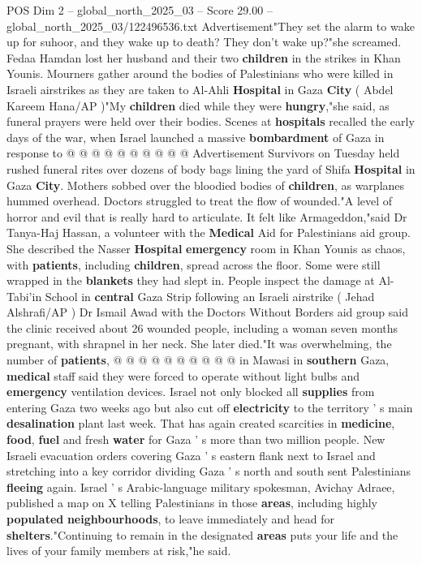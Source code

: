 \begin{textsample}{POS Dim 2 – global\_north\_2025\_03 – Score 29.00 – global\_north\_2025\_03/122496536.txt}
Advertisement"They set the alarm to wake up for suhoor, and they wake up to death?
They don't wake up?"she screamed.
Fedaa Hamdan lost her husband and their two \textbf{children} in the strikes in Khan Younis.
Mourners gather around the bodies of Palestinians who were killed in Israeli airstrikes as they are taken to Al-Ahli \textbf{Hospital} in Gaza \textbf{City} ( Abdel Kareem Hana/AP )"My \textbf{children} died while they were \textbf{hungry},"she said, as funeral prayers were held over their bodies.
Scenes at \textbf{hospitals} recalled the early days of the war, when Israel launched a massive \textbf{bombardment} of Gaza in response to @ @ @ @ @ @ @ @ @ @ Advertisement Survivors on Tuesday held rushed funeral rites over dozens of body bags lining the yard of Shifa \textbf{Hospital} in Gaza \textbf{City}.
Mothers sobbed over the bloodied bodies of \textbf{children}, as warplanes hummed overhead.
Doctors struggled to treat the flow of wounded."A level of horror and evil that is really hard to articulate.
It felt like Armageddon,"said Dr Tanya-Haj Hassan, a volunteer with the \textbf{Medical} Aid for Palestinians aid group.
She described the Nasser \textbf{Hospital} \textbf{emergency} room in Khan Younis as chaos, with \textbf{patients}, including \textbf{children}, spread across the floor.
Some were still wrapped in the \textbf{blankets} they had slept in.
People inspect the damage at Al-Tabi'in School in \textbf{central} Gaza Strip following an Israeli airstrike ( Jehad Alshrafi/AP ) Dr Ismail Awad with the Doctors Without Borders aid group said the clinic received about 26 wounded people, including a woman seven months pregnant, with shrapnel in her neck.
She later died."It was overwhelming, the number of \textbf{patients}, @ @ @ @ @ @ @ @ @ @ in Mawasi in \textbf{southern} Gaza, \textbf{medical} staff said they were forced to operate without light bulbs and \textbf{emergency} ventilation devices.
Israel not only blocked all \textbf{supplies} from entering Gaza two weeks ago but also cut off \textbf{electricity} to the territory ' s main \textbf{desalination} plant last week.
That has again created scarcities in \textbf{medicine}, \textbf{food}, \textbf{fuel} and fresh \textbf{water} for Gaza ' s more than two million people.
New Israeli evacuation orders covering Gaza ' s eastern flank next to Israel and stretching into a key corridor dividing Gaza ' s north and south sent Palestinians \textbf{fleeing} again.
Israel ' s Arabic-language military spokesman, Avichay Adraee, published a map on X telling Palestinians in those \textbf{areas}, including highly \textbf{populated} \textbf{neighbourhoods}, to leave immediately and head for \textbf{shelters}."Continuing to remain in the designated \textbf{areas} puts your life and the lives of your family members at risk,"he said.

\end{textsample}
